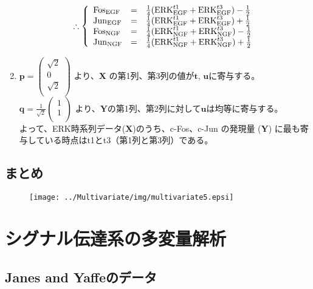 \begin{enumerate}
\[ \therefore
\left\{
\begin{array}{lll}
{\rm Fos}_{\rm EGF} & = & \frac{1}{4}( {\rm ERK}^{t1}_{\rm EGF} + {\rm ERK}^{t3}_{\rm EGF} ) - \frac{1}{2} \\
{\rm Jun}_{\rm EGF} & = & \frac{1}{4}( {\rm ERK}^{t1}_{\rm EGF} + {\rm ERK}^{t3}_{\rm EGF} ) + \frac{1}{2} \\
{\rm Fos}_{\rm NGF} & = & \frac{1}{4}( {\rm ERK}^{t1}_{\rm NGF} + {\rm ERK}^{t3}_{\rm NGF} ) - \frac{1}{2} \\
{\rm Jun}_{\rm NGF} & = & \frac{1}{4}( {\rm ERK}^{t1}_{\rm NGF} + {\rm ERK}^{t3}_{\rm NGF} ) + \frac{1}{2} \\
\end{array}
\right.
\]
\item \(
{\mathbf p} =  
\left(
\begin{array}{r}
\sqrt{2} \\
 0 \\
\sqrt{2} \\
\end{array}
\right) 
\) より、\({\mathbf X}\) の第1列、第3列の値が\({\mathbf t}\), \({\mathbf u}\)に寄与する。\\

\(
{\mathbf q} = 
\frac{1}{\sqrt{2}}
\left(
\begin{array}{r}
1 \\
1 \\
\end{array}
\right)
\) より、\({\mathbf Y}\)の第1列、第2列に対して\({\mathbf u}\)は均等に寄与する。\\
よって、ERK時系列データ(\({\mathbf X}\))のうち、c-Fos、c-Jun の発現量 (\({\mathbf Y}\)) に最も寄与している時点はt1とt3（第1列と第3列）である。
\end{enumerate}

\subsection{まとめ}
\begin{figure}[h]
\begin{center}
\texttt{[image: ../Multivariate/img/multivariate5.epsi]}
\end{center}
\end{figure}


\section{シグナル伝達系の多変量解析}
\subsection{Janes and Yaffeのデータ}
